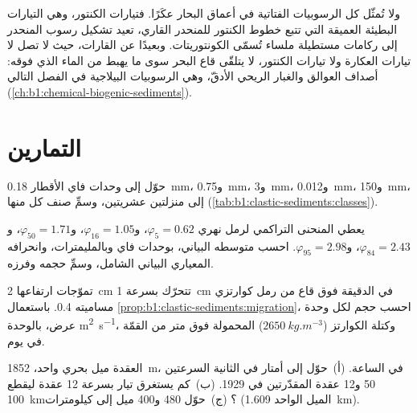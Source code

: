 ولا تُمثّل كل الرسوبيات الفتاتية في أعماق البحار عكَرًا. فتيارات الكنتور، وهي التيارات البطيئة العميقة التي تتبع خطوط الكنتور للمنحدر القاري، تعيد تشكيل رسوب المنحدر إلى ركامات مستطيلة ملساء تُسمّى الكونتوريتات. وبعيدًا عن القارات، حيث لا تصل لا تيارات العكارة ولا تيارات الكنتور، لا يتلقّى قاع البحر سوى ما يهبط من الماء الذي فوقه: أصداف العوالق والغبار الريحي الأدقّ، وهي الرسوبيات البيلاجية في الفصل التالي (\cref{ch:b1:chemical-biogenic-sediments}).

\section{التمارين}

\begin{exercise}[$\star$]\label{exo:b1:clastic-sediments:1}
حوّل إلى وحدات فاي الأقطار \qty{0.18}{mm}، و\qty{0.75}{mm}، و\qty{3}{mm}، و\qty{0.012}{mm}، و\qty{150}{mm}، إلى منزلتين عشريتين، وسمِّ صنف كل منها (\cref{tab:b1:clastic-sediments:classes}).
\end{exercise}

\begin{exercise}[$\star$]\label{exo:b1:clastic-sediments:2}
يعطي المنحنى التراكمي لرمل نهري $\varphi_5 = 0.62$، و$\varphi_{16} =
1.05$، و$\varphi_{50} = 1.71$، و$\varphi_{84} = 2.43$، و$\varphi_{95} = 2.98$. احسب متوسطه البياني، بوحدات فاي وبالمليمترات، وانحرافه المعياري البياني الشامل، وسمِّ حجمه وفرزه.
\end{exercise}

\begin{exercise}[$\star$]\label{exo:b1:clastic-sediments:3}
تموّجات ارتفاعها \qty{2}{cm} تتحرّك بسرعة \qty{1}{cm} في الدقيقة فوق قاع من رمل كوارتزي مساميته \num{0.4}. باستعمال \cref{prop:b1:clastic-sediments:migration}، احسب حجم  لكل وحدة عرض، بالوحدة \si{m^2.s^{-1}}، وكتلة الكوارتز ($\qty{2650}{kg.m^{-3}}$) المحمولة فوق متر من القمّة في يوم.
\end{exercise}

\begin{exercise}[$\star$]\label{exo:b1:clastic-sediments:4}
العقدة ميل بحري واحد، \qty{1852}{m}، في الساعة. (أ)~حوّل إلى أمتار في الثانية السرعتين 50 و\num{12} عقدة المقدّرتين  في 1929. (ب)~كم يستغرق تيار بسرعة 12 عقدة ليقطع \qty{100}{km}؟ (ج)~حوّل 480 و\num{400} ميل إلى كيلومترات (الميل الواحد \qty{1.609}{km}).
\end{exercise}

